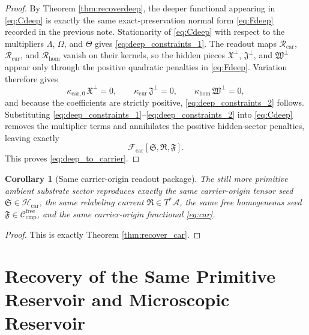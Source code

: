\documentclass[11pt]{article}
\newcommand{\Sub}{\mathcal A}
\newcommand{\CompFree}{\mathscr C_{\mathrm{cmp}}^{\mathrm{free}}}
\newcommand{\CarrierFunctional}{\mathscr F_{\mathrm{car}}}
\newcommand{\CarrierClass}{\mathscr H_{\mathrm{car}}}
\newcommand{\CarrierSeed}{\mathfrak S}
\newcommand{\RelabelSeed}{\mathfrak R}
\newcommand{\FreeSeed}{\mathfrak F}
\newcommand{\PreCarGap}{\kappa_{\mathrm{car},0}}
\newcommand{\CurrentGap}{\kappa_{\mathrm{cur}}}
\newcommand{\HomGap}{\kappa_{\mathrm{hom}}}
\newcommand{\StrainMult}{\Lambda}
\newcommand{\NeutralMult}{\Omega}
\newcommand{\FreeMult}{\Theta}
\newcommand{\DeepTensor}{\mathfrak X}
\newcommand{\DeepRelabel}{\mathfrak J}
\newcommand{\DeepFree}{\mathfrak W}
\newcommand{\CarRead}{\mathcal R_{\mathrm{car}}}
\newcommand{\CurRead}{\mathcal R_{\mathrm{cur}}}
\newcommand{\HomRead}{\mathcal R_{\mathrm{hom}}}
\newtheorem{corollary}{Corollary}
\begin{document}
\begin{proof}
By Theorem \ref{thm:recoverdeep}, the deeper functional appearing in \eqref{eq:Cdeep} is exactly the same exact-preservation normal form \eqref{eq:Fdeep} recorded in the previous note. Stationarity of \eqref{eq:Cdeep} with respect to the multipliers \(\StrainMult\), \(\NeutralMult\), and \(\FreeMult\) gives \eqref{eq:deep_constraints_1}. The readout maps \(\CarRead\), \(\CurRead\), and \(\HomRead\) vanish on their kernels, so the hidden pieces \(\DeepTensor^{\perp}\), \(\DeepRelabel^{\perp}\), and \(\DeepFree^{\perp}\) appear only through the positive quadratic penalties in \eqref{eq:Fdeep}. Variation therefore gives
\[
\PreCarGap\,\DeepTensor^{\perp}=0,
\qquad
\CurrentGap\,\DeepRelabel^{\perp}=0,
\qquad
\HomGap\,\DeepFree^{\perp}=0,
\]
and because the coefficients are strictly positive, \eqref{eq:deep_constraints_2} follows. Substituting \eqref{eq:deep_constraints_1}--\eqref{eq:deep_constraints_2} into \eqref{eq:Cdeep} removes the multiplier terms and annihilates the positive hidden-sector penalties, leaving exactly
\[
\CarrierFunctional[\CarrierSeed,\RelabelSeed,\FreeSeed].
\]
This proves \eqref{eq:deep_to_carrier}.
\end{proof}

\begin{corollary}[Same carrier-origin readout package]
\label{cor:same_car_package}
The still more primitive ambient substrate sector reproduces exactly the same carrier-origin tensor seed \(\CarrierSeed\in\CarrierClass\), the same relabeling current \(\RelabelSeed\in T^*\Sub\), the same free homogeneous seed \(\FreeSeed\in\CompFree\), and the same carrier-origin functional \eqref{eq:car}.
\end{corollary}

\begin{proof}
This is exactly Theorem \ref{thm:recover_car}.
\end{proof}

\section{Recovery of the Same Primitive Reservoir and Microscopic Reservoir}
\end{document}
